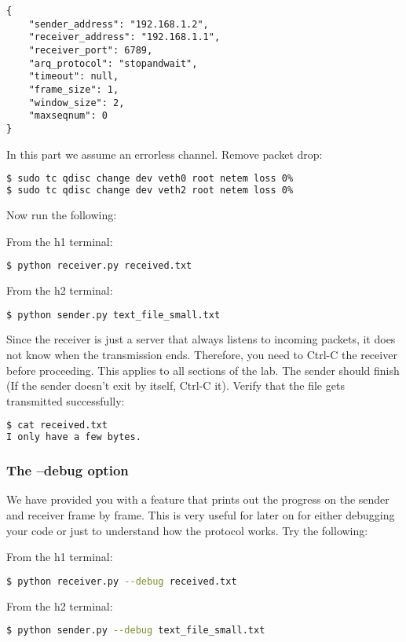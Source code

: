 \documentclass[11pt]{article}
\begin{document}
\begin{minipage}{\linewidth}
\begin{lstlisting}[caption={Configuration For Small File}]
{
    "sender_address": "192.168.1.2",
    "receiver_address": "192.168.1.1",
    "receiver_port": 6789,
    "arq_protocol": "stopandwait",
    "timeout": null,
    "frame_size": 1,
    "window_size": 2,
    "maxseqnum": 0
}
\end{lstlisting}
\end{minipage}

In this part we assume an errorless channel. Remove packet drop:
\begin{lstlisting}[language=bash]
$ sudo tc qdisc change dev veth0 root netem loss 0%
$ sudo tc qdisc change dev veth2 root netem loss 0%
\end{lstlisting}
Now run the following:

From the h1 terminal:
\begin{lstlisting}[language=bash]
$ python receiver.py received.txt
\end{lstlisting}
From the h2 terminal:
\begin{lstlisting}[language=bash]
$ python sender.py text_file_small.txt
\end{lstlisting}
Since the receiver is just a server that always listens to incoming packets, it does not know when the transmission ends. Therefore, you need to Ctrl-C the receiver before proceeding. This applies to all sections of the lab.
The sender should finish (If the sender doesn't exit by itself, Ctrl-C it). Verify that the file gets transmitted successfully:
\begin{lstlisting}[language=bash]
$ cat received.txt
I only have a few bytes.
\end{lstlisting}

\subsubsection {The --debug option}
We have provided you with a feature that prints out the progress on the sender and receiver frame by frame. This is very useful for later on for either debugging your code or just to understand how the protocol works. Try the following:

From the h1 terminal:
\begin{lstlisting}[language=bash]
$ python receiver.py --debug received.txt
\end{lstlisting}
From the h2 terminal:
\begin{lstlisting}[language=bash]
$ python sender.py --debug text_file_small.txt
\end{lstlisting}
\end{document}

